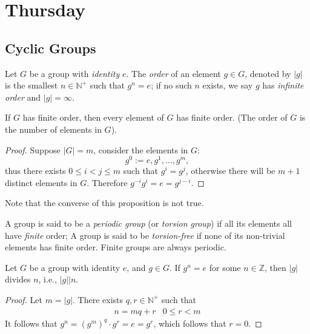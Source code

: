 

\section{Thursday}
\subsection{Cyclic Groups}
\begin{definition}[order]
Let $G$ be a group with \emph{identity} $e$. The \emph{order} of an element $g\in G$, denoted by $|g|$ is the smallest $n\in\mathbb{N}^+$ such that $g^n=e$; if no such $n$ exists, we say $g$ has \emph{infinite order} and $|g|=\infty$.
\end{definition}
\begin{proposition}
If $G$ has finite order, then every element of $G$ has finite order. (The order of $G$ is the number of elements in $G$).
\end{proposition}
\begin{proof}
Suppose $|G|=m$, consider the elements in $G$:
\[
g^0:=e,g^1,\dots,g^m,
\]
thus there exists $0\le i<j\le m$ such that $g^i=g^j$, otherwise there will be $m+1$ distinct elements in $G$. Therefore $g^{-i}g^i=e=g^{j-i}$.
\end{proof}
\begin{remark}
Note that the converse of this proposition is not true.
\end{remark}
\begin{definition}[Torsion]
A group is said to be a \emph{periodic group} (or \emph{torsion group}) if all its elements all have \emph{finite} order; A group is said to be \emph{torsion-free} if none of its non-trivial elements has finite order. Finite groups are always periodic.
\end{definition}
\begin{proposition}
Let $G$ be a group with identity $e$, and $g\in G$. If $g^n=e$ for some $n\in\mathbb{Z}$, then $|g|$ divides $n$, i.e., $|g| | n$.
\end{proposition}
\begin{proof}
Let $m=|g|$. There exists $q,r\in\mathbb{N}^+$ such that\[
\begin{array}{ll}
n = mq+r
&
0\le r<m
\end{array}
\]
It follows that $g^n=(g^m)^q\cdot g^r=e=g^r$, which follows that $r=0$.
\end{proof}
